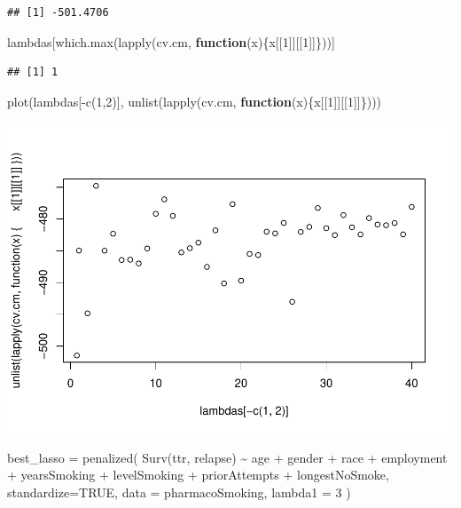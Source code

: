 \documentclass[
]{article}
\newenvironment{Shaded}{\begin{snugshade}}{\end{snugshade}}
\newcommand{\AttributeTok}[1]{\textcolor[rgb]{0.77,0.63,0.00}{#1}}
\newcommand{\ConstantTok}[1]{\textcolor[rgb]{0.00,0.00,0.00}{#1}}
\newcommand{\ControlFlowTok}[1]{\textcolor[rgb]{0.13,0.29,0.53}{\textbf{#1}}}
\newcommand{\DecValTok}[1]{\textcolor[rgb]{0.00,0.00,0.81}{#1}}
\newcommand{\FunctionTok}[1]{\textcolor[rgb]{0.00,0.00,0.00}{#1}}
\newcommand{\NormalTok}[1]{#1}
\newcommand{\OtherTok}[1]{\textcolor[rgb]{0.56,0.35,0.01}{#1}}
\newcommand{\SpecialCharTok}[1]{\textcolor[rgb]{0.00,0.00,0.00}{#1}}
\begin{document}
\begin{verbatim}
## [1] -501.4706
\end{verbatim}

\begin{Shaded}
\begin{Highlighting}[]
\NormalTok{lambdas[}\FunctionTok{which.max}\NormalTok{(}\FunctionTok{lapply}\NormalTok{(cv.cm, }\ControlFlowTok{function}\NormalTok{(x)\{x[[}\DecValTok{1}\NormalTok{]][[}\DecValTok{1}\NormalTok{]]\}))]}
\end{Highlighting}
\end{Shaded}

\begin{verbatim}
## [1] 1
\end{verbatim}

\begin{Shaded}
\begin{Highlighting}[]
\FunctionTok{plot}\NormalTok{(lambdas[}\SpecialCharTok{{-}}\FunctionTok{c}\NormalTok{(}\DecValTok{1}\NormalTok{,}\DecValTok{2}\NormalTok{)], }\FunctionTok{unlist}\NormalTok{(}\FunctionTok{lapply}\NormalTok{(cv.cm, }\ControlFlowTok{function}\NormalTok{(x)\{x[[}\DecValTok{1}\NormalTok{]][[}\DecValTok{1}\NormalTok{]]\})))}
\end{Highlighting}
\end{Shaded}

\includegraphics{hw_7_files/figure-latex/unnamed-chunk-5-3.pdf}

\begin{Shaded}
\begin{Highlighting}[]
\NormalTok{best\_lasso }\OtherTok{=} \FunctionTok{penalized}\NormalTok{(}
    \FunctionTok{Surv}\NormalTok{(ttr, relapse) }\SpecialCharTok{\textasciitilde{}}\NormalTok{ age }\SpecialCharTok{+}\NormalTok{ gender }\SpecialCharTok{+}\NormalTok{ race }\SpecialCharTok{+} 
\NormalTok{      employment }\SpecialCharTok{+}\NormalTok{ yearsSmoking }\SpecialCharTok{+}\NormalTok{ levelSmoking }\SpecialCharTok{+} 
\NormalTok{      priorAttempts }\SpecialCharTok{+}\NormalTok{ longestNoSmoke, }
    \AttributeTok{standardize=}\ConstantTok{TRUE}\NormalTok{,}
    \AttributeTok{data =}\NormalTok{ pharmacoSmoking,}
    \AttributeTok{lambda1 =} \DecValTok{3}
\NormalTok{  )}
\end{Highlighting}
\end{Shaded}
\end{document}
